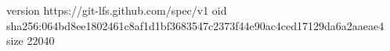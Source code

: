 version https://git-lfs.github.com/spec/v1
oid sha256:064bd8ee1802461c8af1d1bf3683547c2373f44e90ac4ced17129da6a2aaeae4
size 22040
